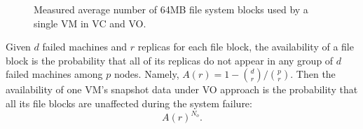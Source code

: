 


\begin{figure}[htbp]
  \centering
  \caption{Measured average number of 64MB file system blocks used by a single VM in
VC and VO. }
  \label{fig:vm-links}
\end{figure}

Given $d$ failed machines and $r$ replicas for each file block,
the availability of a file block is the probability that  
all of its replicas do not appear in any group of $d$ failed machines among $p$ nodes. 
Namely, 
$
A(r) = 1-\binom{d}{r}/ \binom{p}{r}. 
$
Then the availability of one VM's snapshot data under VO approach is the probability that
 all its file blocks  are unaffected during the system failure:
\[
A(r)^{N_o}. 
\]

